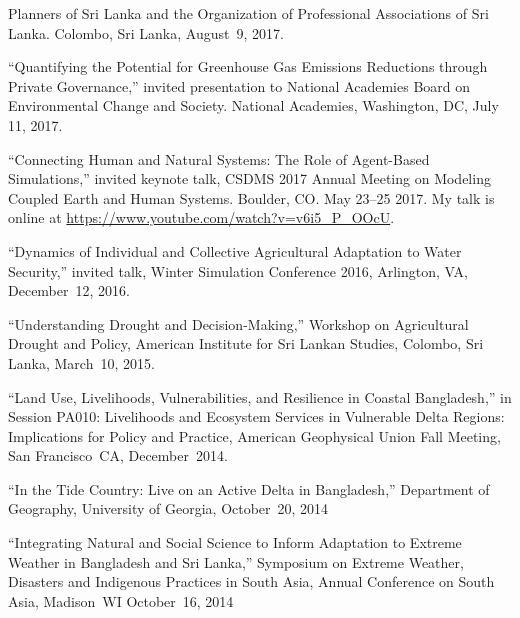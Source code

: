   Planners of Sri Lanka and the Organization of Professional Associations of
  Sri Lanka. Colombo, Sri Lanka, August~9, 2017.
\item ``Quantifying the Potential for Greenhouse Gas Emissions Reductions
  through Private Governance,'' invited presentation to National Academies
  Board on Environmental Change and Society. National Academies, Washington,
  DC, July 11, 2017.
\item  ``Connecting Human and Natural Systems: The Role of Agent-Based
  Simulations,'' invited keynote talk, CSDMS 2017 Annual Meeting on Modeling
  Coupled Earth and Human Systems. Boulder, CO. May 23--25 2017.
  My talk is online at
  \url{https://www.youtube.com/watch?v=v6i5_P_OOcU}.
\item  ``Dynamics of Individual and Collective Agricultural Adaptation to Water
  Security,'' invited talk, Winter Simulation Conference 2016, Arlington, VA,
  December~12, 2016.
\item ``Understanding Drought and Decision-Making,'' Workshop on Agricultural
  Drought and Policy, American Institute for Sri Lankan Studies, Colombo, Sri
  Lanka, March~10, 2015.
\item ``Land Use, Livelihoods, Vulnerabilities, and Resilience in Coastal
  Bangladesh,'' in Session PA010: Livelihoods and Ecosystem Services in
  Vulnerable Delta Regions: Implications for Policy and Practice, American
  Geophysical Union Fall Meeting, San Francisco~CA, December~2014.
\item ``In the Tide Country: Live on an Active Delta in Bangladesh,''
  Department of Geography, University of Georgia, October~20, 2014
\item ``Integrating Natural and Social Science to Inform Adaptation to Extreme
  Weather in Bangladesh and Sri Lanka,'' Symposium on Extreme Weather,
  Disasters and Indigenous Practices in South Asia, Annual Conference on South
  Asia, Madison~WI October~16, 2014
